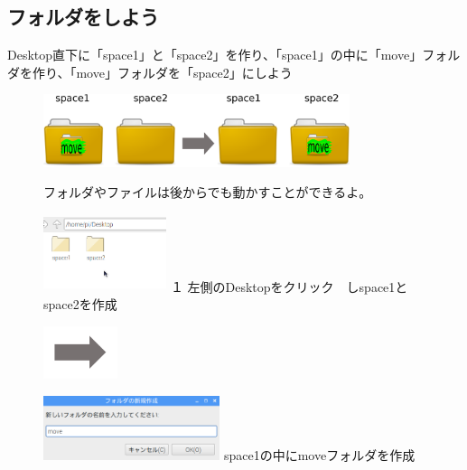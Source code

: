 \documentclass[a4paper,12pt]{jarticle}
\begin{document}
\subsection{\theExercise フォルダをしよう}
Desktop直下に「space1」と「space2」を作り、「space1」の中に「move」フォルダを作り、「move」フォルダを「space2」にしよう



\begin{figure}[ht]
  \centering
  \includegraphics[width=0.8\textwidth]{fig15-1.eps}
  \begin{minipage}{15.297cm}
    フォルダやファイルは後からでも動かすことができるよ。
  \end{minipage}

  \begin{minipage}{5.963cm}
    \includegraphics[width=3.604cm,height=2.268cm]{textbook-img051.png}
    {\flushleft
      １
      左側のDesktopをクリック　しspace1とspace2を作成
    }
  \end{minipage}
  \includegraphics[width=2.168cm,height=1.542cm]{textbook-img052.png}
  \begin{minipage}{7.473cm}
    \includegraphics[width=5.166cm,height=1.882cm]{textbook-img050.png}
    { space1の中にmoveフォルダを作成
    }
  \end{minipage}


\end{figure}
\end{document}
